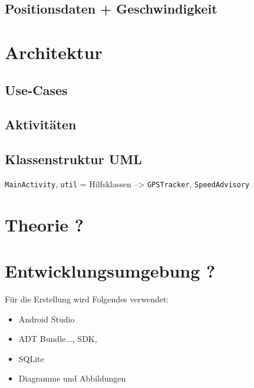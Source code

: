 \subsection{Positionsdaten + Geschwindigkeit}
\section{Architektur}
\subsection{Use-Cases}
\subsection{Aktivitäten}
\subsection{Klassenstruktur UML}
\texttt{MainActivity},  \texttt{util} = Hilfsklassen --> \texttt{GPSTracker}, \texttt{SpeedAdvisory}
\section{Theorie ?}
\section{Entwicklungsumgebung ?}
Für die Erstellung wird Folgendes verwendet:
\begin{itemize}
	\item Android Studio
	\item ADT Bundle..., SDK, 
	\item SQLite
	\item Diagramme und Abbildungen
\end{itemize}
